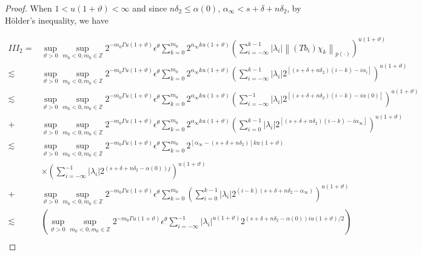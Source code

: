 \documentclass[10pt,a4paper]{amsart}
\begin{document}
\begin{proof}
When $1<u(1+\vartheta)<\infty$ and since $n \delta_{2} \leq  \alpha(0)$, $\alpha_{\infty}<s+\delta+n \delta_{2}$, by H\"older's inequality, we have


\begin{align*}
I I I_{2}=& \sup_{\vartheta>0 }\sup _{m_0<0, m_0\in  \mathbb{Z}} 2^{-m_0\Gamma u(1+\vartheta)} \epsilon  ^\theta \sum_{k=0}^{m_0} 2^{\alpha_{\infty} k u(1+\vartheta)}\left(\sum_{i=-\infty}^{k-1}\left|\lambda_{i}\right|\left\|\left(T b_{i}\right) \chi_{k}\right\|_{{p(\cdot)}}\right)^{u(1+\vartheta)} \\
 \lesssim & \sup_{\vartheta>0 }\sup _{m_0<0, m_0\in  \mathbb{Z}} 2^{-m_0\Gamma u(1+\vartheta)} \epsilon  ^\theta \sum_{k=0}^{m_0} 2^{\alpha_{\infty} k u(1+\vartheta)}\left(\sum_{i=-\infty}^{k-1}\left|\lambda_{i}\right| 2^{\left[\left(s+\delta+n \delta_{2}\right)(i-k)-i \alpha_{i}\right]}\right)^{u(1+\vartheta)} \\
\lesssim & \sup_{\vartheta>0 }\sup _{m_0<0, m_0\in  \mathbb{Z}} 2^{-m_0\Gamma u(1+\vartheta)} \epsilon  ^\theta \sum_{k=0}^{m_0} 2^{\alpha_{\infty} k u(1+\vartheta)}\left(\sum_{i=-\infty}^{-1}\left|\lambda_{i}\right| 2^{\left[\left(s+\delta+n \delta_{2}\right)(i-k)-i \alpha(0)\right]}\right)^{u(1+\vartheta)} \\
 +&\sup_{\vartheta>0 }\sup _{m_0<0, m_0\in  \mathbb{Z}} 2^{-m_0\Gamma u(1+\vartheta)} \epsilon  ^\theta \sum_{k=0}^{m_0} 2^{\alpha_{\infty} k u(1+\vartheta)}\left(\sum_{i=0}^{k-1}\left|\lambda_{i}\right| 2^{\left[\left(s+\delta+n \delta_{2}\right)(i-k)-i \alpha_{\infty}\right]}\right)^{u(1+\vartheta)} \\
\lesssim & \sup_{\vartheta>0 }\sup _{m_0<0, m_0\in  \mathbb{Z}} 2^{-m_0\Gamma u(1+\vartheta)} \epsilon  ^\theta \sum_{k=0}^{m_0} 2^{\left[\alpha_{\infty}-\left(s+\delta+n \delta_{2}\right)\right] k u(1+\vartheta)} \\
 &\times \left(\sum_{i=-\infty}^{-1}\left|\lambda_{i}\right| 2^{\left(s+\delta+n \delta_{2}-\alpha(0)\right) j}\right)^{u(1+\vartheta)} \\
+& \sup_{\vartheta>0 }\sup _{m_0<0, m_0\in  \mathbb{Z}} 2^{-m_0\Gamma u(1+\vartheta)} \epsilon  ^\theta \sum_{k=0}^{m_0}\left(\sum_{i=0}^{k-1}\left|\lambda_{i}\right| 2^{(i-k)\left(s+\delta+n \delta_{2}-\alpha_{\infty}\right)}\right)^{u(1+\vartheta)} \\
\lesssim & \left(\sup_{\vartheta>0 }\sup _{m_0<0, m_0\in  \mathbb{Z}} 2^{-m_0\Gamma u(1+\vartheta)} \epsilon  ^\theta\sum_{i=-\infty}^{-1}\left|\lambda_{i}\right|^{u(1+\vartheta)} 2^{\left(s+\delta+n \delta_{2}-\alpha(0)\right) iu (1+\vartheta) / 2}\right) \\

\end{align*}
\end{proof}
\end{document}
